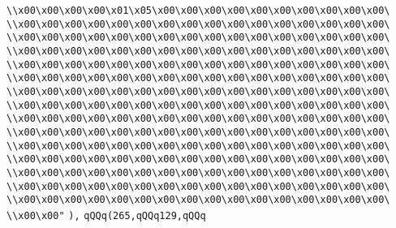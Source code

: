 \verb|\\x00\x00\x00\x00\x01\x05\x00\x00\x00\x00\x00\x00\x00\x00\x00\x00\|\newline
\verb|\\x00\x00\x00\x00\x00\x00\x00\x00\x00\x00\x00\x00\x00\x00\x00\x00\|\newline
\verb|\\x00\x00\x00\x00\x00\x00\x00\x00\x00\x00\x00\x00\x00\x00\x00\x00\|\newline
\verb|\\x00\x00\x00\x00\x00\x00\x00\x00\x00\x00\x00\x00\x00\x00\x00\x00\|\newline
\verb|\\x00\x00\x00\x00\x00\x00\x00\x00\x00\x00\x00\x00\x00\x00\x00\x00\|\newline
\verb|\\x00\x00\x00\x00\x00\x00\x00\x00\x00\x00\x00\x00\x00\x00\x00\x00\|\newline
\verb|\\x00\x00\x00\x00\x00\x00\x00\x00\x00\x00\x00\x00\x00\x00\x00\x00\|\newline
\verb|\\x00\x00\x00\x00\x00\x00\x00\x00\x00\x00\x00\x00\x00\x00\x00\x00\|\newline
\verb|\\x00\x00\x00\x00\x00\x00\x00\x00\x00\x00\x00\x00\x00\x00\x00\x00\|\newline
\verb|\\x00\x00\x00\x00\x00\x00\x00\x00\x00\x00\x00\x00\x00\x00\x00\x00\|\newline
\verb|\\x00\x00\x00\x00\x00\x00\x00\x00\x00\x00\x00\x00\x00\x00\x00\x00\|\newline
\verb|\\x00\x00\x00\x00\x00\x00\x00\x00\x00\x00\x00\x00\x00\x00\x00\x00\|\newline
\verb|\\x00\x00\x00\x00\x00\x00\x00\x00\x00\x00\x00\x00\x00\x00\x00\x00\|\newline
\verb|\\x00\x00\x00\x00\x00\x00\x00\x00\x00\x00\x00\x00\x00\x00\x00\x00\|\newline
\verb|\\x00\x00\x00\x00\x00\x00\x00\x00\x00\x00\x00\x00\x00\x00\x00\x00\|\newline
\verb|\\x00\x00"|\newline
\verb|),|\newline
\verb|qQQq(265,qQQq129,qQQq|\newline
